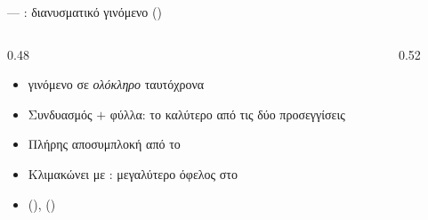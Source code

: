 \begin{frame}{ — \Zvbc \vclmul: διανυσματικό  γινόμενο ()}
  \begin{columns}[T]
    \begin{column}{0.48\textwidth}
      \begin{itemize}
        \item \pos{\Zvbc \vclmul/\vclmulh:}  γινόμενο σε \emph{ολόκληρο}  ταυτόχρονα
        \item Συνδυασμός  $+$  φύλλα: το καλύτερο από τις δύο προσεγγίσεις
        \item Πλήρης αποσυμπλοκή από το 
        \item Κλιμακώνει με \VLEN: μεγαλύτερο όφελος στο 
        \item {} (),  ()
      \end{itemize}
    \end{column}
    \begin{column}{0.52\textwidth}
      \centering
      \resizebox{\columnwidth}{!}{%
      }
    \end{column}
  \end{columns}
\end{frame}
